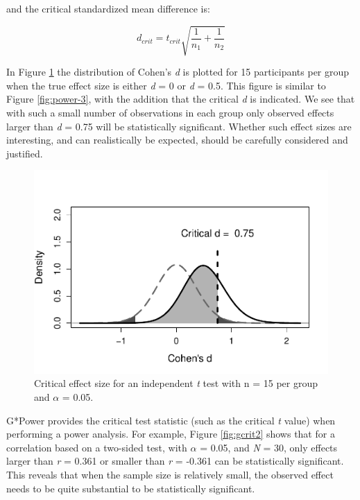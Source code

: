 \documentclass[
  english,
  ,jou, a4paper,floatsintext]{apa6}
\begin{document}
and the critical standardized mean difference is:

\[d_{crit} = t_{crit}{\sqrt{\frac{1}{n_1} + \frac{1}{n_2}}}\]

In Figure \ref{fig:power-effect1} the distribution of Cohen's \emph{d} is plotted for 15 participants per group when the true effect size is either \emph{d} = 0 or \emph{d} = 0.5. This figure is similar to Figure \ref{fig:power-3}, with the addition that the critical \emph{d} is indicated. We see that with such a small number of observations in each group only observed effects larger than \emph{d} = 0.75 will be statistically significant. Whether such effect sizes are interesting, and can realistically be expected, should be carefully considered and justified.

\begin{figure}
\centering
\includegraphics{sample_size_justification_files/figure-latex/power-effect1-1.pdf}
\caption{\label{fig:power-effect1}Critical effect size for an independent \emph{t} test with n = 15 per group and \(\alpha\) = 0.05.}
\end{figure}

G*Power provides the critical test statistic (such as the critical \emph{t} value) when performing a power analysis. For example, Figure \ref{fig:gcrit2} shows that for a correlation based on a two-sided test, with \(\alpha\) = 0.05, and \emph{N} = 30, only effects larger than \emph{r} = 0.361 or smaller than \emph{r} = -0.361 can be statistically significant. This reveals that when the sample size is relatively small, the observed effect needs to be quite substantial to be statistically significant.
\end{document}

